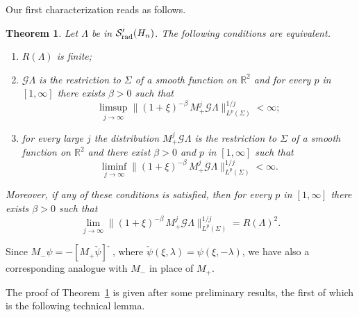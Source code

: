 \documentclass[12pt,a4paper]{amsart}
\theoremstyle{plain}
\newtheorem{theorem}{Theorem}[section]
\theoremstyle{definition}
\numberwithin{equation}{section}
\begin{document}
Our first characterization reads as follows.

\begin{theorem}\label{unoequiv}
Let $\Lambda$ be in ${{\mathcal S}'_{\text{\rm rad}}({{H_{n}}})}$. The following conditions are equivalent.
\begin{enumerate} 
\item
$R(\Lambda)$ is finite; 

\item  ${\mathcal G} \Lambda $ is the restriction to ${\Sigma}$ of
  a smooth function on ${\mathbb R}^2$ and for every $p$ in $[1,\infty]$ there exists $\beta>0$ such that
$$
\limsup_{j\to\infty}
\|(1+\xi)^{-\beta}\, M_+^j {\mathcal G} \Lambda\|_{L^p({\Sigma})}^{1/j}<\infty;
$$

\item 
 for every large $j$  the distribution
$  M_+^j {\mathcal G} \Lambda$ 
is the restriction to ${\Sigma}$ of
  a smooth function on ${\mathbb R}^2$
     and
       there exist $\beta>0$ and $p$ in $[1,\infty]$
such that
$$
\liminf_{j\to\infty} 
\|(1+\xi)^{-\beta}\, M_+^j {\mathcal G} \Lambda\|_{L^p({\Sigma})}^{1/j}
<\infty .
$$ 

\end{enumerate}
Moreover, if any of these conditions is satisfied, then   for every $p$ in $[1,\infty]$ there exists $\beta>0$ such that
\begin{equation}\label{Rspettr}
\lim_{j\to\infty} 
\|(1+\xi)^{-\beta}\, M_+^j{\mathcal G} \Lambda\|_{L^p({\Sigma})}^{1/j}= R(\Lambda)^2.
\end{equation}
\end{theorem}
  
  
Since $M_-\psi = -\left[M_+\check\psi \right]\check{\phantom f}$, where
$\check\psi(\xi,{\lambda})=\psi(\xi,-{\lambda})$,
 we have also a corresponding analogue
 with $M_-$ in place of $M_+$.  

 The proof of Theorem~\ref{unoequiv} is given after some preliminary results,
 the first of which is the following technical lemma.
\end{document}
